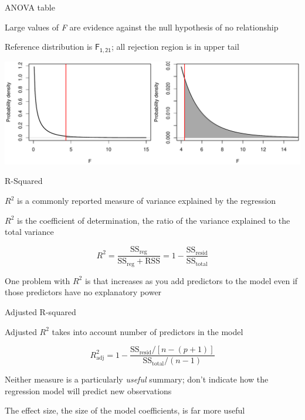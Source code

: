 \documentclass[10pt,ignorenonframetext,compress, aspectratio=169]{beamer}
\begin{document}
\begin{frame}{ANOVA table}

Large values of \emph{F} are evidence against the null hypothesis of no
relationship

Reference distribution is \(\mathsf{F_{1,21}}\); all rejection region is
in upper tail

\begin{center}\includegraphics[width=\textwidth]{03-linear-models_files/figure-beamer/F-rejection-regions-plot-1} \end{center}

\end{frame}

\begin{frame}{R-Squared}

\(R^2\) is a commonly reported measure of variance explained by the
regression

\(R^2\) is the \alert{coefficient of determination}, the ratio of the
variance explained to the total variance

\[R^2 = \frac{\mathrm{SS_{reg}}}{\mathrm{SS_{reg} + RSS}} = 1 - \frac{\mathrm{SS_{resid}}}{\mathrm{SS_{total}}}\]

One problem with \(R^2\) is that increases as you add predictors to the
model even if those predictors have no explanatory power

\end{frame}

\begin{frame}{Adjusted R-squared}

Adjusted \(R^2\) takes into account number of predictors in the model

\[R^2_{\mathrm{adj}} = 1 - \frac{\mathrm{SS_{resid}} / [n - (p + 1)]}{\mathrm{SS_{total}} / (n-1)}\]

Neither measure is a particularly \emph{useful} summary; don't indicate
how the regression model will predict new observations

The \alert{effect size}, the size of the model coefficients, is far more
useful

\end{frame}
\end{document}
